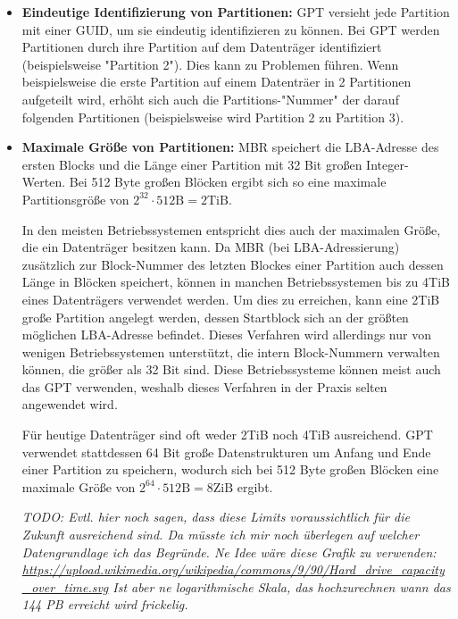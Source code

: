 \begin{itemize}
    \item \textbf{Eindeutige Identifizierung von Partitionen:} 
    GPT versieht jede Partition mit einer GUID, um sie eindeutig identifizieren zu können.
    Bei GPT werden Partitionen durch ihre Partition auf dem Datenträger identifiziert (beispielsweise "Partition 2").
    Dies kann zu Problemen führen. 
    Wenn beispielsweise die erste Partition auf einem Datenträer in 2 Partitionen aufgeteilt wird, erhöht sich auch die Partitions-"Nummer" der darauf folgenden Partitionen (beispielsweise wird Partition 2 zu Partition 3).

    \item \textbf{Maximale Größe von Partitionen:}
    MBR speichert die LBA-Adresse des ersten Blocks und die Länge einer Partition mit 32 Bit großen Integer-Werten.
    Bei 512 Byte großen Blöcken ergibt sich so eine maximale Partitionsgröße von $ 2^{32} \cdot 512 \mathrm{B} = 2 \mathrm{TiB} $.

    In den meisten Betriebssystemen entspricht dies auch der maximalen Größe, die ein Datenträger besitzen kann.
    Da MBR (bei LBA-Adressierung) zusätzlich zur Block-Nummer des letzten Blockes einer Partition auch dessen Länge in Blöcken speichert, können in manchen Betriebssystemen bis zu 4TiB eines Datenträgers verwendet werden. 
    Um dies zu erreichen, kann eine 2TiB große Partition angelegt werden, dessen Startblock sich an der größten möglichen LBA-Adresse befindet.
    Dieses Verfahren wird allerdings nur von wenigen Betriebssystemen unterstützt, die intern Block-Nummern verwalten können, die größer als 32 Bit sind.
    Diese Betriebssysteme können meist auch das GPT verwenden, weshalb dieses Verfahren in der Praxis selten angewendet wird.\cite{mbr-4tb-workaround}

    Für heutige Datenträger sind oft weder 2TiB noch 4TiB ausreichend.
    GPT verwendet stattdessen 64 Bit große Datenstrukturen um Anfang und Ende einer Partition zu speichern, wodurch sich bei 512 Byte großen Blöcken eine maximale Größe von $ 2^{64} \cdot 512 \mathrm{B} = 8 \mathrm{ZiB} $ ergibt.

    \small
    \textit{
    TODO: Evtl. hier noch sagen, dass diese Limits voraussichtlich für die Zukunft ausreichend sind.
    Da müsste ich mir noch überlegen auf welcher Datengrundlage ich das Begründe.
    Ne Idee wäre diese Grafik zu verwenden: \url{https://upload.wikimedia.org/wikipedia/commons/9/90/Hard_drive_capacity_over_time.svg}
    Ist aber ne logarithmische Skala, das hochzurechnen wann das 144 PB erreicht wird frickelig.
    }


\end{itemize}
